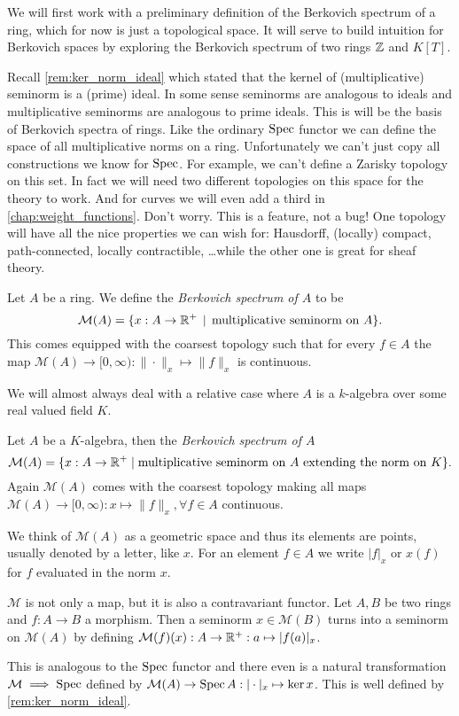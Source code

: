 We will first work with a preliminary definition of the Berkovich spectrum of a ring, which for now is just a topological space. 
It will serve to build intuition for Berkovich spaces by exploring the Berkovich spectrum of two rings $\mathbb{Z}$ and $K[T]$.
\medskip 

Recall \cref{rem:ker_norm_ideal} which stated that the kernel of (multiplicative) seminorm is a (prime) ideal. 
In some sense seminorms are analogous to ideals and multiplicative seminorms are analogous to prime ideals. 
This is will be the basis of Berkovich spectra of rings.
Like the ordinary $\operatorname{Spec}$ functor we can define the space of all multiplicative norms on a ring. 
Unfortunately we can't just copy all constructions we know for $\operatorname{Spec}$. 
For example, we can't define a Zarisky topology on this set. 
In fact we will need two different topologies on this space for the theory to work. 
And for curves we will even add a third in \cref{chap:weight_functions}. 
Don't worry. This is a feature, not a bug! 
One topology will have all the nice properties we can wish for: Hausdorff, (locally) compact, path-connected, locally contractible, \ldots while the other one is great for sheaf theory. 

\begin{definition}
	Let $A$ be a ring. We define the \emph{Berkovich spectrum of $A$} to be \[
		\mathcal{M} (A) = \{x: A \to \R^{+} \st \text{multiplicative seminorm on } A\} 
	.\] 
	This comes equipped with the coarsest topology such that for every $f \in A$ the map $\mathcal{M} (A) \to [0, \infty) : \|\cdot \|_x \mapsto \|f\|_x $ is continuous. 
\end{definition}
	We will almost always deal with a relative case where $A$ is a $k$-algebra over some real valued field $K$. 
\begin{definition}
	Let $A$ be a $K$-algebra, then the \emph{Berkovich spectrum of $A$}
	\[
		\mathcal{M} (A) = \{x : A \to \mathbb{R}^{ + }  \mid \text{multiplicative seminorm on }A \text{ extending the norm on } K\} 
	.\] 
	Again $\mathcal{M} (A)$ comes with the coarsest topology making all maps $\mathcal{M} (A) \to [0, \infty): x \mapsto \|f\|_x, \forall f \in A$ continuous. 
\end{definition}
We think of $\mathcal{M} (A)$ as a geometric space and thus its elements are points, usually denoted by a letter, like $x$. 
For an element $f \in A$ we write $|f|_x$ or $x(f)$ for  $f$ evaluated in the norm $x$. 

\begin{remark}
	$\mathcal{M}$ is not only a map, but it is also a contravariant functor. 
	Let $A, B$ be two rings and $f: A \to B$ a morphism. 
	Then a seminorm $x \in \mathcal{M} (B)$ turns into a seminorm on $\mathcal{M} (A)$ by defining $\mathcal{M} (f)(x): A \to \mathbb{R}^{ +}: a \mapsto |f(a)|_x$.


This is analogous to the $\operatorname{Spec}$ functor and there even is a natural transformation $\mathcal{M} \implies \operatorname{Spec}$ defined by $\mathcal{M} (A) \to \operatorname{Spec} A: |\cdot |_x \mapsto \ker x$. This is well defined by \cref{rem:ker_norm_ideal}. 
\end{remark}


